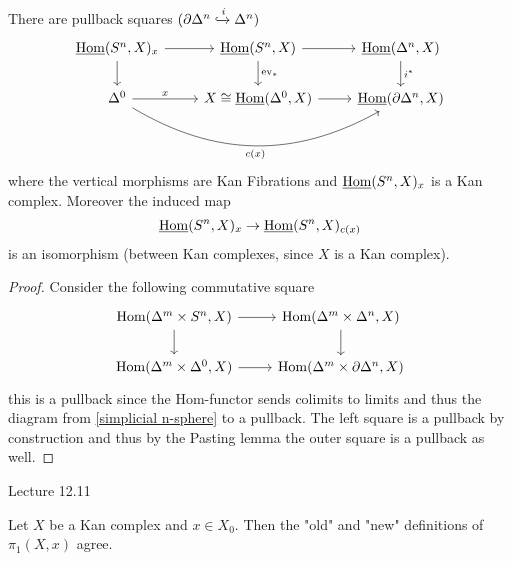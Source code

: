 \begin{prop}
    There are pullback squares $(\partial \Delta^n \xhookrightarrow{i} \Delta^n)$
    \[
    \begin{tikzcd}
        \underline{\Hom}(S^n,X)_x
        \ar[r]
        \ar[d]
        &
        \underline{\Hom}(S^n,X)
        \ar[d, "\ev_*"]
        \ar[r]
        &
        \underline{\Hom}(\Delta^n,X)
        \ar[d,"i^*"]
        \\
        \Delta^0
        \ar[r,"x"]
        \ar[rr, bend right ,"c(x)"']
        &
        X
        \cong 
        \underline{\Hom}(\Delta^0,X)
        \ar[r]
        &
        \underline{\Hom}(\partial \Delta^n,X)
    \end{tikzcd}
    \]
    where the vertical morphisms are Kan Fibrations and $\underline{\operatorname{Hom}}(S^n,X)_x$ is a Kan complex.
    Moreover the induced map 
    \[
        \underline{\operatorname{Hom}}(S^n,X)_x \to \underline{\operatorname{Hom}}(S^n,X)_{c(x)}
    \]
    is an isomorphism (between Kan complexes, since $X$ is a Kan complex).
\end{prop}

\begin{proof}
    Consider the following commutative square
    \[
    \begin{tikzcd}
        \Hom(\Delta^m \times S^n , X ) 
        \ar[r]
        \ar[d]
        &
        \Hom(\Delta^m \times \Delta^n , X )
        \ar[d]
        \\
        \Hom(\Delta^m \times \Delta^0 , X ) 
        \ar[r]
        &
        \Hom(\Delta^m \times \partial \Delta^n , X )
    \end{tikzcd}
    \] 
    this is a pullback since the Hom-functor sends colimits to limits and thus the diagram from \cref{simplicial n-sphere} to a pullback. 
    The left square is a pullback by construction and thus by the Pasting lemma 
    the outer square is a pullback as well.
\end{proof}

Lecture 12.11

\begin{prop}
    Let $X$ be a Kan complex and $x \in X_0$. Then the "old" and "new" definitions of $\pi_1(X,x)$ agree.
\end{prop}

